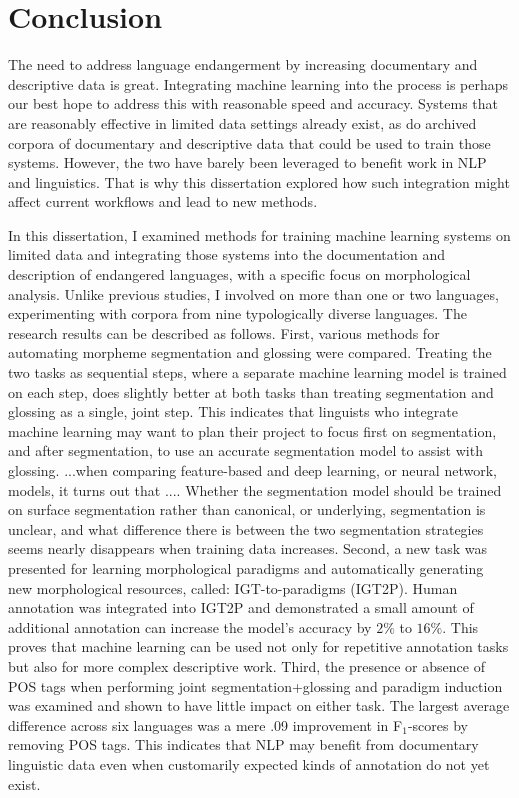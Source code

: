 \chapter{Conclusion}
\label{chap:conclusion}

The need to address language endangerment by increasing documentary and descriptive data is great. Integrating machine learning into the process is perhaps our best hope to address this with reasonable speed and accuracy. Systems that are reasonably effective in limited data settings already exist, as do archived corpora of documentary and descriptive data that could be used to train those systems. However, the two have barely been leveraged to benefit work in NLP and linguistics. That is why this dissertation explored how such integration might affect current workflows and lead to new methods. 

In this dissertation, I examined methods for training machine learning systems on limited data and integrating those systems into the documentation and description of endangered languages, with a specific focus on morphological analysis. Unlike previous studies, I involved on more than one or two languages, experimenting with corpora from nine typologically diverse languages. The research results can be described as follows. First, various methods for automating morpheme segmentation and glossing were compared. Treating the two tasks as sequential steps, where a separate machine learning model is trained on each step, does slightly better at both tasks than treating segmentation and glossing as a single, joint step. This indicates that linguists who integrate machine learning may want to plan their project to focus first on segmentation, and after segmentation, to use an accurate segmentation model to assist with glossing. 
...when comparing feature-based and deep learning, or neural network, models, it turns out that .... 
Whether the segmentation model should be trained on surface segmentation rather than canonical, or underlying, segmentation is unclear, and what difference there is between the two segmentation strategies seems nearly disappears when training data increases. 
Second, a new task was presented for learning morphological paradigms and automatically generating new morphological resources, called: IGT-to-paradigms (IGT2P). Human annotation was integrated into IGT2P and demonstrated a small amount of additional annotation can increase the model's accuracy by $2\%$ to $16\%$. This proves that machine learning can be used not only for repetitive annotation tasks but also for more complex descriptive work. 
Third, the presence or absence of POS tags when performing joint segmentation+glossing and paradigm induction was examined and shown to have little impact on either task. The largest average difference across six languages was a mere .09 improvement in F$_1$-scores by removing POS tags. This indicates that NLP may benefit from documentary linguistic data even when customarily expected kinds of annotation do not yet exist.


